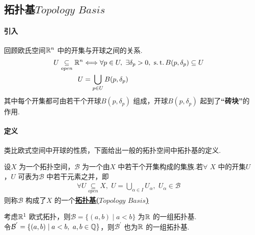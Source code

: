 \newpage
\subsection{拓扑基$Topology \,\, Basis$}
\paragraph{引入}
	回顾欧氏空间$\mathbb{R}^n$ 中的开集与开球之间的关系.
	\begin{align}
		U \underset{open}{\subseteq} \mathbb{R}^n &\Longleftrightarrow \forall p \in U , \,\, \exists \delta_p > 0 , \,\, \operatorname{s.t.} B(p , \delta_p) \subseteq U\\
		U &= \bigcup_{p \in U}{B(p , \delta_p)}
	\end{align}
	其中每个开集都可由若干个开球$B(p , \delta_p)$ 组成，开球$B(p , \delta_p)$ 起到了\textbf{“砖块”}的作用.

\vspace*{2em}
\paragraph{定义}
	类比欧式空间中开球的性质，下面给出一般的拓扑空间中拓扑基的定义.
	\begin{defn}\label{def 1.1.5}
		设$X$ 为一个拓扑空间，$\mathcal{B}$ 为一个由$X$ 中若干个开集构成的集族.若$\forall \,\, X$ 中的开集$U$，$U$ 可表为$\mathcal{B}$ 中若干元素之并，即
		\begin{align}
			\forall U \underset{open}{\subseteq} X , \,\, U = \bigcup_{\alpha \in I}{U_\alpha} , \,\, U_\alpha \in \mathcal{B}
		\end{align}
		则称$\mathcal{B}$ 构成了$X$ 的一个\underline{\textbf{拓扑基($Topology \,\, Basis$)}}
	\end{defn}
	\begin{example}\label{ex 1.1.3}
		考虑$\mathbb{R}^1$ 欧式拓扑，则$\mathcal{B} = \{ (a , b) \mid a < b \}$ 为$\mathbb{R}$ 的一组拓扑基.\\
		令$\mathcal{B}^{'} = \{ (a , b) \mid a < b , \,\, a , b \in \mathbb{Q} \}$，则$\mathcal{B}^{'}$ 也为$\mathbb{R}$ 的一组拓扑基.
	\end{example}

